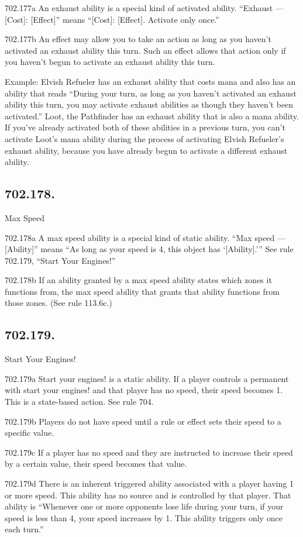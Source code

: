 702.177a An exhaust ability is a special kind of activated ability. “Exhaust — [Cost]: [Effect]” means “[Cost]: [Effect]. Activate only once.”

702.177b An effect may allow you to take an action as long as you haven’t activated an exhaust ability this turn. Such an effect allows that action only if you haven’t begun to activate an exhaust ability this turn.

Example: Elvish Refueler has an exhaust ability that costs mana and also has an ability that reads “During your turn, as long as you haven’t activated an exhaust ability this turn, you may activate exhaust abilities as though they haven’t been activated.” Loot, the Pathfinder has an exhaust ability that is also a mana ability. If you’ve already activated both of these abilities in a previous turn, you can’t activate Loot’s mana ability during the process of activating Elvish Refueler’s exhaust ability, because you have already begun to activate a different exhaust ability.

\subsection*{702.178.}
Max Speed

702.178a A max speed ability is a special kind of static ability. “Max speed — [Ability]” means “As long as your speed is 4, this object has ‘[Ability].’” See rule 702.179, “Start Your Engines!”

702.178b If an ability granted by a max speed ability states which zones it functions from, the max speed ability that grants that ability functions from those zones. (See rule 113.6c.)

\subsection*{702.179.}
Start Your Engines!

702.179a Start your engines! is a static ability. If a player controls a permanent with start your engines! and that player has no speed, their speed becomes 1. This is a state-based action. See rule 704.

702.179b Players do not have speed until a rule or effect sets their speed to a specific value.

702.179c If a player has no speed and they are instructed to increase their speed by a certain value, their speed becomes that value.

702.179d There is an inherent triggered ability associated with a player having 1 or more speed. This ability has no source and is controlled by that player. That ability is “Whenever one or more opponents lose life during your turn, if your speed is less than 4, your speed increases by 1. This ability triggers only once each turn.”

